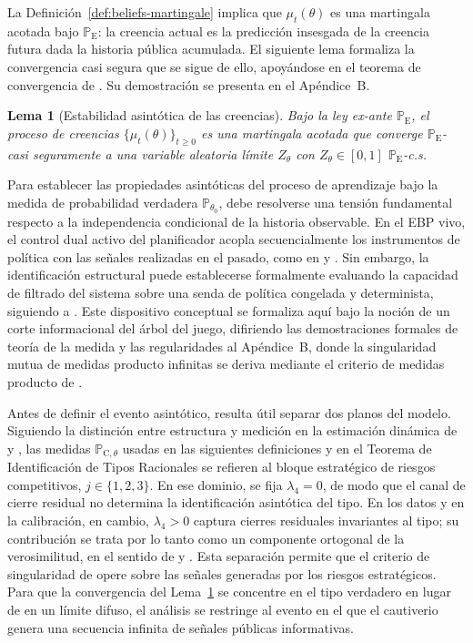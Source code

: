 \documentclass[review,authoryear,12pt]{elsarticle}
\theoremstyle{plain}
\newtheorem{lemma}[theorem]{Lema}
\theoremstyle{definition}
\newcommand{\ProbE}{\mathbb{P}_{\mathrm{E}}}
\newcommand{\ProbC}[1]{\mathbb{P}_{\mathrm{C},#1}}
\newcommand{\1}{\mathbf{1}}
\begin{document}
La Definición~\ref{def:beliefs-martingale} implica que $\mu_t(\theta)$ es una martingala acotada bajo $\ProbE$: la creencia actual es la predicción insesgada de la creencia futura dada la historia pública acumulada. El siguiente lema formaliza la convergencia casi segura que se sigue de ello, apoyándose en el teorema de convergencia de \citet{Doob1953Stochastic}. Su demostración se presenta en el Apéndice~B.

\begin{lemma}[Estabilidad asintótica de las creencias]\label{lem:asymptotic-beliefs}
Bajo la ley ex-ante $\ProbE$, el proceso de creencias $\{\mu_t(\theta)\}_{t\ge 0}$ es una martingala acotada que converge $\ProbE$-casi seguramente a una variable aleatoria límite $Z_\theta$ con $Z_\theta\in[0,1]$ $\ProbE$-c.s.
\end{lemma}

\smallskip

Para establecer las propiedades asintóticas del proceso de aprendizaje bajo la medida de probabilidad verdadera $\mathbb{P}_{\theta_0}$, debe resolverse una tensión fundamental respecto a la independencia condicional de la historia observable. En el EBP vivo, el control dual activo del planificador acopla secuencialmente los instrumentos de política con las señales realizadas en el pasado, como en \citet{AghionBoltonHarrisJullien1991} y \citet{EasleyKiefer1988}. Sin embargo, la identificación estructural puede establecerse formalmente evaluando la capacidad de filtrado del sistema sobre una senda de política congelada y determinista, siguiendo a \citet{BlackwellDubins1962}. Este dispositivo conceptual se formaliza aquí bajo la noción de un corte informacional del árbol del juego, difiriendo las demostraciones formales de teoría de la medida y las regularidades al Apéndice~B, donde la singularidad mutua de medidas producto infinitas se deriva mediante el criterio de medidas producto de \citet{Kakutani1948}.

Antes de definir el evento asintótico, resulta útil separar dos planos del modelo. Siguiendo la distinción entre estructura y medición en la estimación dinámica de \citet{Rust1987} y \citet{MagnacThesmar2002}, las medidas $\ProbC{\theta}$ usadas en las siguientes definiciones y en el Teorema de Identificación de Tipos Racionales se refieren al bloque estratégico de riesgos competitivos, $j\in\{1,2,3\}$. En ese dominio, se fija $\lambda_4=0$, de modo que el canal de cierre residual no determina la identificación asintótica del tipo. En los datos y en la calibración, en cambio, $\lambda_4>0$ captura cierres residuales invariantes al tipo; su contribución se trata por lo tanto como un componente ortogonal de la verosimilitud, en el sentido de \citet{Lancaster1990} y \citet{AbbringVanDenBerg2003}. Esta separación permite que el criterio de singularidad de \citet{Kakutani1948} opere sobre las señales generadas por los riesgos estratégicos. Para que la convergencia del Lema~\ref{lem:asymptotic-beliefs} se concentre en el tipo verdadero en lugar de en un límite difuso, el análisis se restringe al evento en el que el cautiverio genera una secuencia infinita de señales públicas informativas.
\end{document}
